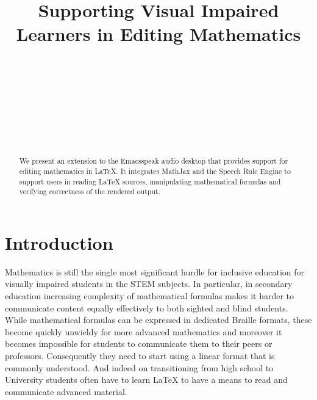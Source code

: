 \documentclass{sig-alternate}
\begin{document}


\title{Supporting Visual Impaired Learners in Editing Mathematics}
  

\author{
  \\
  \\
  \\
  \\
  \\
  \\
  \\
}

\maketitle

\begin{abstract}
  We present an extension to the Emacsspeak audio desktop that provides support
  for editing mathematics in {\LaTeX}. It integrates MathJax and the Speech Rule
  Engine to support users in reading {\LaTeX} sources, manipulating mathematical
  formulas and verifying correctness of the rendered output.
\end{abstract}



\enlargethispage{10pt}
\section{Introduction}


Mathematics is still the single most significant hurdle for inclusive education
for visually impaired students in the STEM subjects. In particular, in secondary
education increasing complexity of mathematical formulas makes it harder to
communicate content equally effectively to both sighted and blind students.
While mathematical formulas can be expressed in dedicated Braille formats, these
become quickly unwieldy for more advanced mathematics and moreover it becomes
impossible for students to communicate them to their peers or
professors. Consequently they need to start using a linear format that is
commonly understood. And indeed on transitioning from high school to University
students often have to learn {\LaTeX} to have a means to read and communicate
advanced material.
\end{document}
